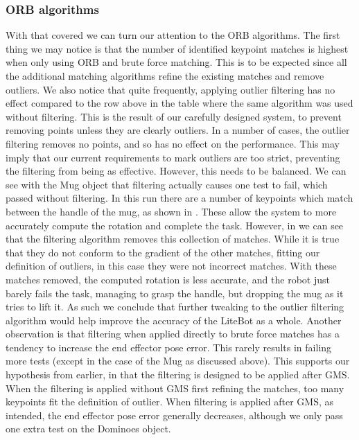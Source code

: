 \subsubsection{ORB algorithms}
With that covered we can turn our attention to the ORB algorithms. The first thing we may notice is that the number of identified keypoint matches is highest when only using ORB and brute force matching. This is to be expected since all the additional matching algorithms refine the existing matches and remove outliers. We also notice that quite frequently, applying outlier filtering has no effect compared to the row above in the table where the same algorithm was used without filtering. This is the result of our carefully designed system, to prevent removing points unless they are clearly outliers. In a number of cases, the outlier filtering removes no points, and so has no effect on the performance. This may imply that our current requirements to mark outliers are too strict, preventing the filtering from being as effective. However, this needs to be balanced. We can see with the Mug object that filtering actually causes one test to fail, which passed without filtering. In this run there are a number of keypoints which match between the handle of the mug, as shown in . These allow the system to more accurately compute the rotation and complete the task. However, in  we can see that the filtering algorithm removes this collection of matches. While it is true that they do not conform to the gradient of the other matches, fitting our definition of outliers, in this case they were not incorrect matches. With these matches removed, the computed rotation is less accurate, and the robot just barely fails the task, managing to grasp the handle, but dropping the mug as it tries to lift it. As such we conclude that further tweaking to the outlier filtering algorithm would help improve the accuracy of the LiteBot as a whole. Another observation is that filtering when applied directly to brute force matches has a tendency to increase the end effector pose error. This rarely results in failing more tests (except in the case of the Mug as discussed above). This supports our hypothesis from earlier, in that the filtering is designed to be applied after GMS. When the filtering is applied without GMS first refining the matches, too many keypoints fit the definition of outlier. When filtering is applied after GMS, as intended, the end effector pose error generally decreases, although we only pass one extra test on the Dominoes object.

